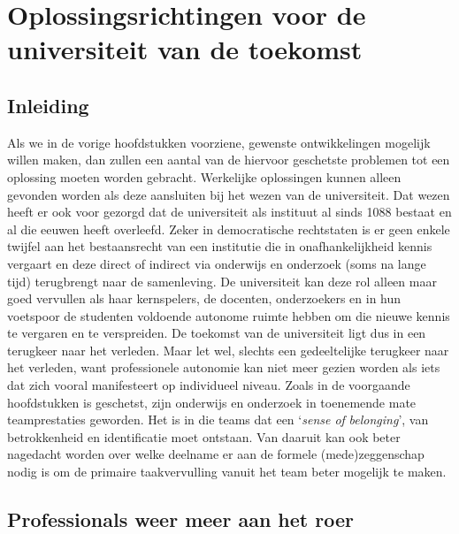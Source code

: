 \documentclass[smallauthor, chapterhaspagenum, nochapterinheader, pagenuminheader,  bigchapnum,medium2, tocpages,  garamond, titleinheader]{jote-book}
\begin{document}
	\section{Oplossingsrichtingen voor de universiteit van de toekomst}



	\subsection{Inleiding}



	Als we in de vorige hoofdstukken voorziene, gewenste ontwikkelingen mogelijk willen maken, dan zullen een aantal van de hiervoor geschetste problemen tot een oplossing moeten worden gebracht. Werkelijke oplossingen kunnen alleen gevonden worden als deze aansluiten bij het wezen van de universiteit. Dat wezen heeft er ook voor gezorgd dat de universiteit als instituut al sinds 1088 bestaat en al die eeuwen heeft overleefd. Zeker in democratische rechtstaten is er geen enkele twijfel aan het bestaansrecht van een institutie die in onafhankelijkheid kennis vergaart en deze direct of indirect via onderwijs en onderzoek (soms na lange tijd) terugbrengt naar de samenleving. De universiteit kan deze rol alleen maar goed vervullen als haar kernspelers, de docenten, onderzoekers en in hun voetspoor de studenten voldoende autonome ruimte hebben om die nieuwe kennis te vergaren en te verspreiden. De toekomst van de universiteit ligt dus in een terugkeer naar het verleden. Maar let wel, slechts een gedeeltelijke terugkeer naar het verleden, want professionele autonomie kan niet meer gezien worden als iets dat zich vooral manifesteert op individueel niveau. Zoals in de voorgaande hoofdstukken is geschetst, zijn onderwijs en onderzoek in toenemende mate teamprestaties geworden. Het is in die teams dat een ‘\emph{sense of }\emph{belonging}', van betrokkenheid en identificatie moet ontstaan. Van daaruit kan ook beter nagedacht worden over welke deelname er aan de formele (mede)zeggenschap nodig is om de primaire taakvervulling vanuit het team beter mogelijk te maken.



	\subsection{Professionals weer meer aan het roer}
\end{document}
